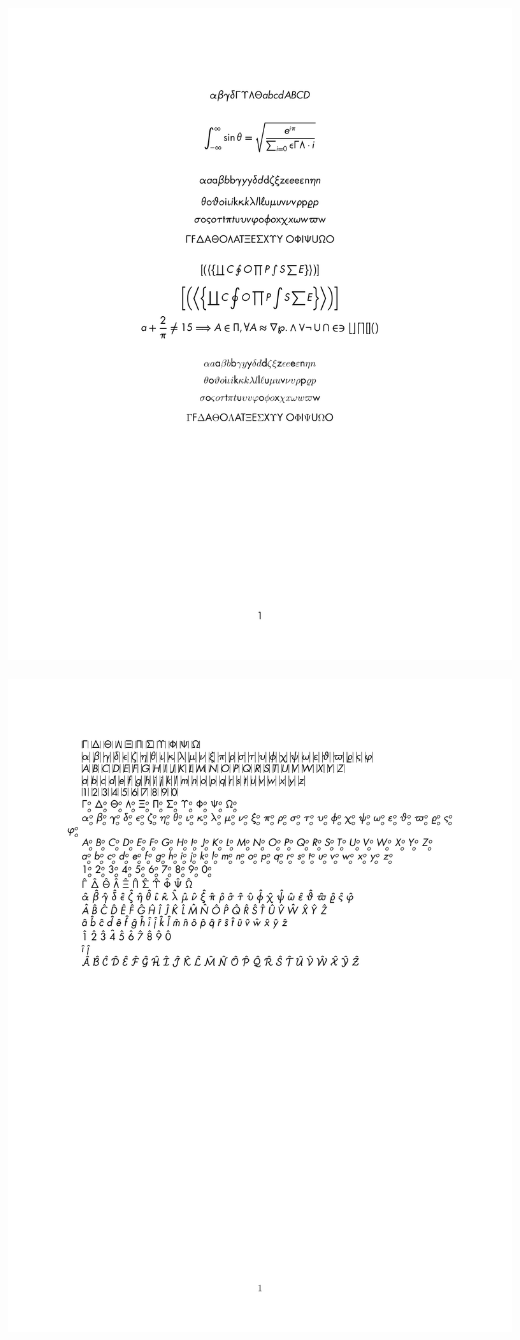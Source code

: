 \documentclass[twocolumn]{article}
\begin{document}
 \noindent\includegraphics*{../results/futura-font}\par
{} \noindent\includegraphics*{../results/futura-pos}\par
\end{document}
